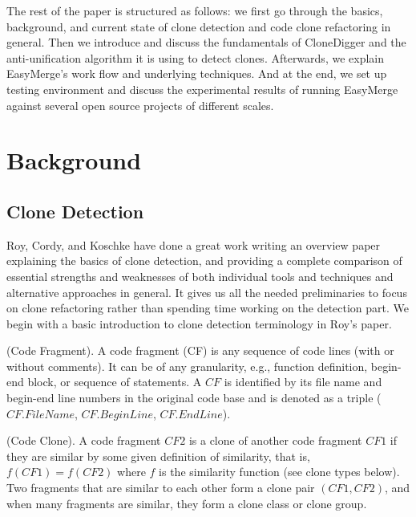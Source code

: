 \documentclass{acm_proc_article-sp}
\begin{document}
The rest of the paper is structured as follows: we first go through the basics, background, and current state of clone detection and code clone refactoring in general.
Then we introduce and discuss the fundamentals of CloneDigger and the anti-unification algorithm it is using to detect clones. Afterwards, we explain EasyMerge's
work flow and underlying techniques. And at the end, we set up testing environment and discuss the experimental results of running EasyMerge against several
open source projects of different scales.

\section{Background}
\subsection{Clone Detection}
Roy, Cordy, and Koschke have done a great work \cite{roy2} writing an overview paper explaining the basics of clone detection, and providing a complete comparison of essential
strengths and weaknesses of both individual tools and techniques and alternative approaches in general. It gives us all the needed preliminaries to focus on clone refactoring rather
than spending time working on the detection part. We begin with a basic introduction to clone detection terminology in Roy's paper.

\begin{definition}
(Code Fragment). A code fragment (CF) is any sequence of code lines (with or without comments). It can be of any granularity, e.g., function
definition, begin-end block, or sequence of statements. A $CF$ is identified by its file name and begin-end line numbers in the original code base
and is denoted as a triple ($CF.FileName$, $CF.BeginLine$, $CF.EndLine$).
\end{definition}

\begin{definition}
(Code Clone). A code fragment $CF2$ is a clone of another code fragment $CF1$ if they are similar by some given definition of similarity, that is, 
$f(CF1) = f(CF2)$ where $f$ is the similarity function (see clone types below). Two fragments that are similar to each other form a clone pair
$(CF1, CF2)$, and when many fragments are similar, they form a clone class or clone group.
\end{definition}
\end{document}
